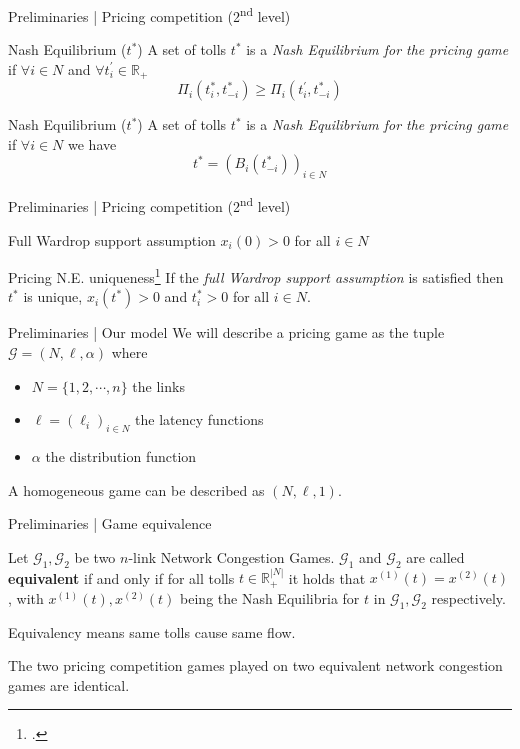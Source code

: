 \documentclass{beamer}
\newcommand{\R}{\mathbb{R}}
\newcommand{\Gm}{\mathcal{G}}
\begin{document}
\begin{frame}{Preliminaries | Pricing competition (2\textsuperscript{nd} level)}
	\begin{block}{Nash Equilibrium ($t^*$)}
		A set of tolls $t^*$ is a \textit{Nash Equilibrium for the pricing game} if $\forall i \in N$ and $\forall t_i^\prime \in \R_+$
		\[\Pi_i(t_i^*, t_{-i}^*) \geq \Pi_i(t_i^\prime, t_{-i}^*)\]
	\end{block}
	\begin{block}{Nash Equilibrium ($t^*$)}
		A set of tolls $t^*$ is a \textit{Nash Equilibrium for the pricing game} if
		$\forall i \in N$ we have
		\[t^* = (B_i(t_{-i}^*))_{i \in N}\]
	\end{block}
\end{frame}

\begin{frame}{Preliminaries | Pricing competition (2\textsuperscript{nd} level)}
	\begin{block}{Full Wardrop support assumption}
		$x_i(0) > 0$ for all $i \in N$
	\end{block}
	\begin{block}{Pricing N.E. uniqueness\footcite{Harks_2019}}
		If the \textit{full Wardrop support assumption} is satisfied then $t^*$ is unique, $x_i(t^*) > 0$ and $t_i^* > 0$ for all $i \in N$.
	\end{block}
\end{frame}

\begin{frame}{Preliminaries | Our model}
	We will describe a pricing game as the tuple $\Gm = (N, \ell, \alpha)$ where
	\begin{itemize}
		\item $N = \{1, 2, \cdots, n\}$ the links
		\item $\ell = (\ell_i)_{i \in N}$ the latency functions
		\item $\alpha$ the distribution function
	\end{itemize}
	A homogeneous game can be described as $(N, \ell, 1)$.
\end{frame}

\begin{frame}{Preliminaries | Game equivalence}
	\begin{definition}
		Let $\Gm_1, \Gm_2$ be two $n$-link Network Congestion Games.
		$\Gm_1$ and $\Gm_2$ are called \textbf{equivalent} if and only if for all tolls $t \in \R_+^{|N|}$ it holds that $x^{(1)}(t) = x^{(2)}(t)$, with $x^{(1)}(t), x^{(2)}(t)$ being the Nash Equilibria for $t$ in $\Gm_1, \Gm_2$ respectively.
	\end{definition}
	Equivalency means same tolls cause same flow.

	The two pricing competition games played on two equivalent network congestion games are identical.
\end{frame}
\end{document}
